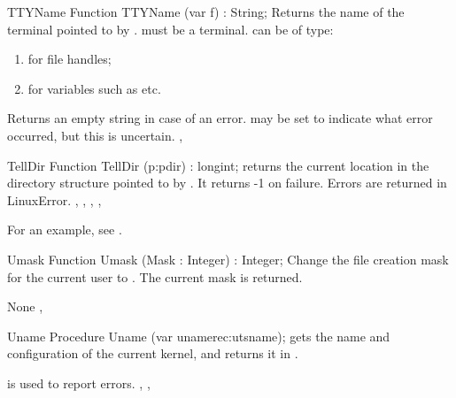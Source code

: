 \begin{function}{TTYName}
\Declaration
Function TTYName (var f) : String;
\Description
Returns the name of the terminal pointed to by . 
must be a terminal.  can be of type:
\begin{enumerate}
\item {} for file handles;
\item {} for  variables such as  etc.
\end{enumerate}

\Errors
 Returns an empty string in case of an error.  may be set
 to indicate what error occurred, but this is uncertain.
\SeeAlso
{},
\end{function}

\begin{function}{TellDir}
\Declaration
Function TellDir (p:pdir) : longint;
\Description
  returns the current location in the directory structure
pointed to by . It returns -1 on failure.
\Errors
Errors are returned in LinuxError.
\SeeAlso
{}, , , ,
\end{function}
For an example, see .

\begin{function}{Umask}
\Declaration
Function Umask (Mask : Integer) : Integer;
\Description
Change the file creation mask for the current user to . The
current mask is returned.

\Errors
None
\SeeAlso
{}, 
\end{function}


\begin{procedure}{Uname}
\Declaration
Procedure Uname (var unamerec:utsname);
\Description
{} gets the name and configuration of the current \linux kernel,
and returns it in .

\Errors
{} is used to report errors.
\SeeAlso
{}, , 
\end{procedure}

